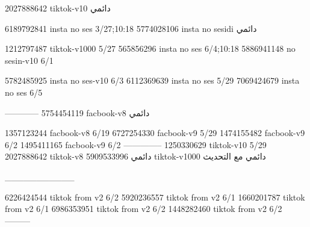 2027888642 tiktok-v10
دائمي

6189792841 insta no ses
3/27;10:18
5774028106 insta no sesidi
دائمي

1212797487 tiktok-v1000
5/27
565856296 insta no ses
6/4;10:18
5886941148 no sesin-v10
6/1

5782485925 insta no ses-v10
6/3
6112369639 insta no ses
5/29
7069424679 insta no ses
6/5

------------
5754454119 facbook-v8
دائمي

1357123244 facbook-v8
6/19
6727254330 facbook-v9
5/29
1474155482 facbook-v9
6/2
1495411165 facbook-v9
6/2
--------------
1250330629 tiktok-v10
5/29
2027888642 tiktok-v8
دائمي
5909533996 tiktok-v1000
دائمي مع التحديث

___________

6226424544 tiktok from v2
6/2
5920236557 tiktok from v2
6/1
1660201787 tiktok from v2
6/1
6986353951 tiktok from v2
6/2
1448282460 tiktok from v2
6/2
---------
